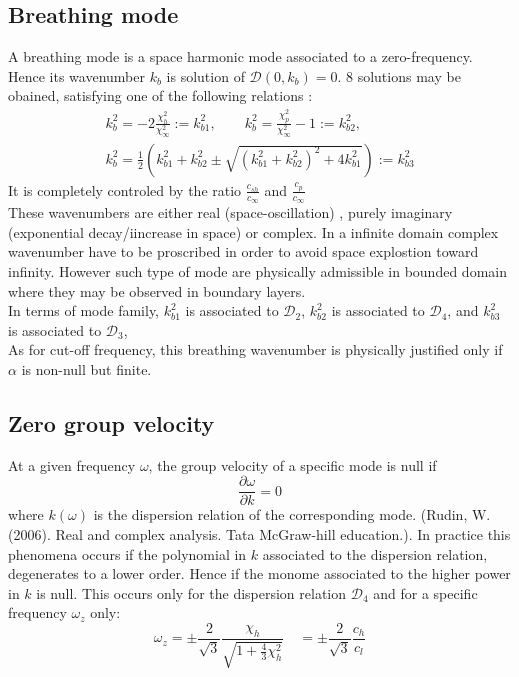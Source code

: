 \documentclass[
10pt, %
a4paper, %
oneside, %
headinclude,footinclude, %
table
]{scrartcl}
\begin{document}
\subsection{Breathing mode}
A breathing mode is a space harmonic mode associated to a zero-frequency. Hence its wavenumber $k_{b}$ is solution of $\mathcal{D}(0,k_{b})=0$. 8 solutions may be obained, satisfying one of the following relations :
$$
\begin{array}{c}
k^2_{b}=-2\frac{\chi_{h}^2}{\chi_{\infty}^2}:=k^2_{b1}, \quad\quad
k^2_{b}=\frac{\chi_{p}^2}{\chi_{\infty}^2}-1:=k^2_{b2}, \\[8pt]
k^2_{b}=\frac{1}{2}\left(k^2_{b1}+k^2_{b2}\pm \sqrt{(k^2_{b1}+k^2_{b2})^2+4k^2_{b1}}\right):=k^2_{b3}
\end{array}
$$
It is completely controled by the ratio $\frac{c_{sh}}{c_{\infty}}$ and $\frac{c_{p}}{c_{\infty}}$\\
These wavenumbers are either real (space-oscillation) , purely imaginary (exponential decay/iincrease in space) or complex. In a infinite domain complex wavenumber have to be proscribed in order to avoid space explostion toward infinity. However such type of mode are physically admissible in bounded domain where they may be observed in boundary layers.  \\
In terms of mode family, $k^2_{b1}$ is associated to $\mathcal{D}_{2}$, $k^2_{b2}$ is associated to $\mathcal{D}_{4}$, and $k^2_{b3}$ is associated to $\mathcal{D}_{3}$, \\
As for cut-off frequency, this breathing wavenumber is physically justified only if $\alpha$ is non-null but finite. 

\subsection{Zero group velocity}
At a given frequency $\omega$, the group velocity of a specific mode is null if 
$$
\frac{\partial \omega}{\partial k}=0
$$
where $k(\omega)$ is the dispersion relation of the corresponding mode. (Rudin, W. (2006). Real and complex analysis. Tata McGraw-hill education.). In practice this phenomena occurs if the polynomial in $k$ associated to the dispersion relation, degenerates to a lower order. Hence if the monome associated to the higher power in $k$ is null. This occurs only for the dispersion relation $\mathcal{D}_{4}$ and for a specific frequency $\omega_{z}$ only: 
$$
\boxed{\omega_{z}=\pm\frac{2}{\sqrt{3}}\frac{\chi_{h}}{\sqrt {1+\frac{4}{3}\chi_{h}^2}}\quad =\pm\frac{2}{\sqrt{3}}\frac{c_{h}}{c_{l}}}
$$
\end{document}

